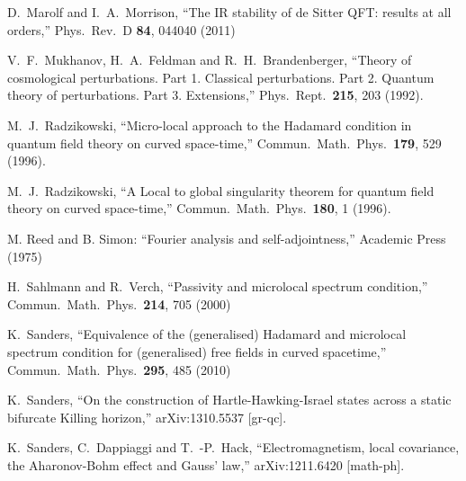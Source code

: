 \documentclass[12pt]{article}
\theoremstyle{plain}
\theoremstyle{definition}
\begin{document}
\begin{thebibliography}{99}
 D.~Marolf and I.~A.~Morrison,
  ``The IR stability of de Sitter QFT: results at all orders,''
  Phys.\ Rev.\ D {\bf 84}, 044040 (2011)

  V.~F.~Mukhanov, H.~A.~Feldman and R.~H.~Brandenberger,
  ``Theory of cosmological perturbations. Part 1. Classical perturbations. Part 2. Quantum theory of perturbations. Part 3. Extensions,''
  Phys.\ Rept.\  {\bf 215}, 203 (1992).




M.~J.~Radzikowski,
  ``Micro-local approach to the Hadamard condition in quantum field theory on curved space-time,''
  Commun.\ Math.\ Phys.\  {\bf 179}, 529 (1996).

 M.~J.~Radzikowski,
  ``A Local to global singularity theorem for quantum field theory on curved space-time,''
  Commun.\ Math.\ Phys.\  {\bf 180}, 1 (1996).

M. Reed and B. Simon: ``Fourier analysis and self-adjointness,'' Academic Press (1975)




H.~Sahlmann and R.~Verch,
 ``Passivity and microlocal spectrum condition,''
  Commun.\ Math.\ Phys.\  {\bf 214}, 705 (2000)

 K.~Sanders,
  ``Equivalence of the (generalised) Hadamard and microlocal spectrum condition for (generalised) free fields in curved spacetime,''
  Commun.\ Math.\ Phys.\  {\bf 295}, 485 (2010)


K.~Sanders,
  ``On the construction of Hartle-Hawking-Israel states across a static bifurcate Killing horizon,''
  arXiv:1310.5537 [gr-qc].

K.~Sanders, C.~Dappiaggi and T.~-P.~Hack,
 ``Electromagnetism, local covariance, the Aharonov-Bohm effect and Gauss' law,''
  arXiv:1211.6420 [math-ph].


\end{thebibliography}
\end{document}
